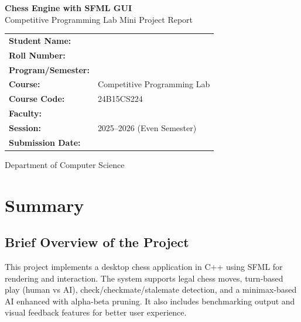 \documentclass[12pt,a4paper]{article}
\begin{document}
\begin{titlepage}
    \centering
    \vspace*{2cm}
    {\Huge \textbf{Chess Engine with SFML GUI}}\\[0.8cm]
    {\Large Competitive Programming Lab Mini Project Report}\\[2cm]

    \begin{tabular}{>{\bfseries}p{5cm} p{8cm}}
        Student Name: & \underline{\hspace{8cm}} \\
        Roll Number: & \underline{\hspace{8cm}} \\
        Program/Semester: & \underline{\hspace{8cm}} \\
        Course: & Competitive Programming Lab \\
        Course Code: & 24B15CS224 \\
        Faculty: & \underline{\hspace{8cm}} \\
        Session: & 2025--2026 (Even Semester) \\
        Submission Date: & \underline{\hspace{8cm}} \\
    \end{tabular}

    \vfill
    {\large Department of Computer Science}\\
    {\large \underline{\hspace{8cm}}}
\end{titlepage}

\tableofcontents
\newpage

\section{Summary}
\subsection{Brief Overview of the Project}
This project implements a desktop chess application in C++ using SFML for rendering and interaction. The system supports legal chess moves, turn-based play (human vs AI), check/checkmate/stalemate detection, and a minimax-based AI enhanced with alpha-beta pruning. It also includes benchmarking output and visual feedback features for better user experience.
\end{document}
